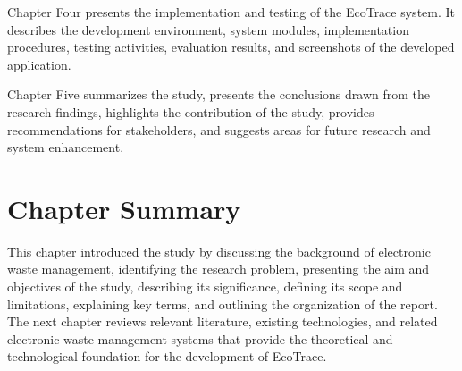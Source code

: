Chapter Four presents the implementation and testing of the EcoTrace system.
It describes the development environment, system modules, implementation
procedures, testing activities, evaluation results, and screenshots of the developed
application.

Chapter Five summarizes the study, presents the conclusions drawn from the
research findings, highlights the contribution of the study, provides recommendations
for stakeholders, and suggests areas for future research and system enhancement.

\section{Chapter Summary}

This chapter introduced the study by discussing the background of electronic waste
management, identifying the research problem, presenting the aim and objectives of
the study, describing its significance, defining its scope and limitations, explaining
key terms, and outlining the organization of the report. The next chapter reviews
relevant literature, existing technologies, and related electronic waste management
systems that provide the theoretical and technological foundation for the
development of EcoTrace.
